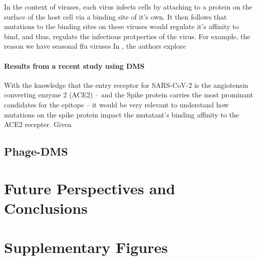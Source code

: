 \documentclass{article}
\newcommand{\beginsupplement}{%
        \setcounter{table}{0}
        \renewcommand{\thetable}{S\arabic{table}}%
        \setcounter{figure}{0}
        \renewcommand{\thefigure}{S\arabic{figure}}%
     }
\begin{document}
In the context of viruses, each virus infects cells by attaching to a protein on the surface of the host cell via a binding site of it's own.
It then follows that mutations to the binding sites on these viruses would regulate it's affinity to bind, and thus, regulate the infectious protperties of the virus.
For example, the reason we have seasonal flu viruses 
In \citet{Bloom2014}, the authors explore 

\paragraph*{Results from a recent study using DMS}

With the knowledge that the entry receptor for SARS-CoV-2 is the angiotensin converting enzyme 2 (ACE2) -- and the Spike protein carries the most prominant candidates for the epitope -- it would be very relevant to understand how mutations on the spike protein impact the mutatant's binding affinity to the ACE2 recepter.
Given 


\subsection*{Phage-DMS}

\section*{Future Perspectives and Conclusions}




% 
% 




\section*{Supplementary Figures}

\end{document}
